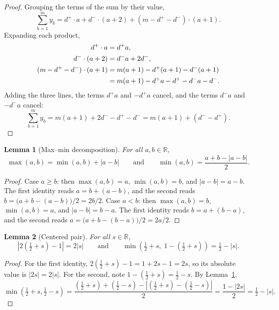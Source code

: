 \documentclass[11pt]{article}
\newtheorem{alemma}{Lemma}[section] %
\begin{document}
\begin{proof}
Grouping the terms of the sum by their value,
\begin{equation}
  \sum_{b=1}^m y_b
  = d^+\cdot a + d^-\cdot(a+2) + (m-d^+-d^-)\cdot(a+1).
\end{equation}
Expanding each product,
\begin{align}
  d^+\cdot a &= d^+a,\\
  d^-\cdot(a+2) &= d^-a+2d^-,\\
  (m-d^+-d^-)\cdot(a+1) &= m(a+1)-d^+(a+1)-d^-(a+1)\notag\\
  &= m(a+1)-d^+a-d^+-d^-a-d^-.
\end{align}
Adding the three lines, the terms $d^+a$ and $-d^+a$ cancel, and the terms $d^-a$ and $-d^-a$ cancel:
\begin{equation}
  \sum_{b=1}^m y_b
  = m(a+1)+2d^--d^+-d^-
  = m(a+1)+(d^--d^+).
\end{equation}
\end{proof}

\begin{alemma}[Max--min decomposition]\label{alem:maxmin}
For all $a,b\in\mathbb{R}$,
\begin{equation}
  \max(a,b)=\min(a,b)+|a-b|
  \qquad\text{and}\qquad
  \min(a,b)=\frac{a+b-|a-b|}{2}.
\end{equation}
\end{alemma}

\begin{proof}
Case $a\ge b$: then $\max(a,b)=a$, $\min(a,b)=b$, and $|a-b|=a-b$.  The first identity reads $a=b+(a-b)$, and the second reads $b=\bigl(a+b-(a-b)\bigr)/2=2b/2$.  Case $a<b$: then $\max(a,b)=b$, $\min(a,b)=a$, and $|a-b|=b-a$.  The first identity reads $b=a+(b-a)$, and the second reads $a=\bigl(a+b-(b-a)\bigr)/2=2a/2$.
\end{proof}

\begin{alemma}[Centered pair]\label{alem:centered}
For all $s\in\mathbb{R}$,
\begin{equation}
  \left|2\left(\tfrac12+s\right)-1\right|=2|s|
  \qquad\text{and}\qquad
  \min\left(\tfrac12+s,\;1-\left(\tfrac12+s\right)\right)=\tfrac12-|s|.
\end{equation}
\end{alemma}

\begin{proof}
For the first identity, $2(\tfrac12+s)-1=1+2s-1=2s$, so its absolute value is $|2s|=2|s|$.  For the second, note $1-(\tfrac12+s)=\tfrac12-s$.  By Lemma~\ref{alem:maxmin},
\begin{equation}
  \min\left(\tfrac12+s,\tfrac12-s\right)
  =\frac{\left(\tfrac12+s\right)+\left(\tfrac12-s\right)-\left|\left(\tfrac12+s\right)-\left(\tfrac12-s\right)\right|}{2}
  =\frac{1-|2s|}{2}
  =\tfrac12-|s|.
\end{equation}
\end{proof}
\end{document}
